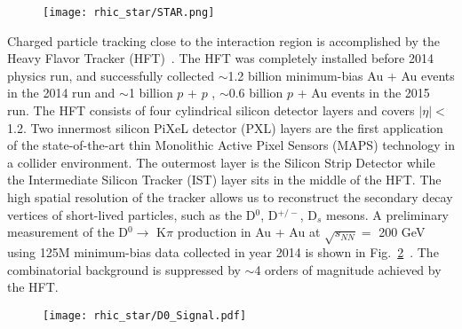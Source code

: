 \begin{figure}[htbp]
\centering
\texttt{[image: rhic\_star/STAR.png]}
 \label{star}
\end{figure}

Charged particle tracking close to the interaction region is accomplished by the Heavy Flavor Tracker (HFT)~\cite{HFTdet}. The HFT was completely installed before 2014 physics run, and successfully collected $\sim$1.2 billion minimum-bias Au + Au events in the 2014 run and $\sim$1 billion $p$ + $p$ , $\sim$0.6 billion $p$ + Au events in the 2015 run. The HFT consists of four cylindrical silicon detector layers and covers $|\eta|<$ 1.2. Two innermost silicon PiXeL detector (PXL) layers are the first application of the state-of-the-art thin Monolithic Active Pixel Sensors (MAPS) technology in a collider environment. The outermost layer is the Silicon Strip Detector while the Intermediate Silicon Tracker (IST) layer sits in the middle of the HFT. The high spatial resolution of the tracker allows us to reconstruct the secondary decay vertices of short-lived particles, such as the D$^{0}$, D$^{+/-}$, D$_{s}$ mesons. A preliminary measurement of the D$^{0}\rightarrow$ K$\pi$ production in Au + Au at $\sqrt{s_{NN}}=$ 200 GeV using 125M minimum-bias data collected in year 2014 is shown in Fig.~\ref{D0signal}~\cite{D0plot}. The combinatorial background is suppressed by $\sim$4 orders of magnitude achieved by the HFT. 

\begin{figure}[htbp]
\centering
\texttt{[image: rhic\_star/D0\_Signal.pdf]}
 \label{D0signal}
\end{figure}

